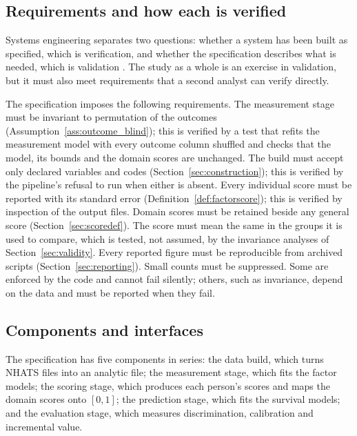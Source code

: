 \subsection{Requirements and how each is verified}

Systems engineering separates two questions: whether a system has been built as specified, which is verification, and whether the specification describes what is needed, which is validation \citep{incose_2015}. The study as a whole is an exercise in validation, but it must also meet requirements that a second analyst can verify directly.

The specification imposes the following requirements. The measurement stage must be invariant to permutation of the outcomes (Assumption~\ref{ass:outcome_blind}); this is verified by a test that refits the measurement model with every outcome column shuffled and checks that the model, its bounds and the domain scores are unchanged. The build must accept only declared variables and codes (Section~\ref{sec:construction}); this is verified by the pipeline's refusal to run when either is absent. Every individual score must be reported with its standard error (Definition~\ref{def:factorscore}); this is verified by inspection of the output files. Domain scores must be retained beside any general score (Section~\ref{sec:scoredef}). The score must mean the same in the groups it is used to compare, which is tested, not assumed, by the invariance analyses of Section~\ref{sec:validity}. Every reported figure must be reproducible from archived scripts (Section~\ref{sec:reporting}). Small counts must be suppressed. Some are enforced by the code and cannot fail silently; others, such as invariance, depend on the data and must be reported when they fail.

\subsection{Components and interfaces}

The specification has five components in series: the data build, which turns NHATS files into an analytic file; the measurement stage, which fits the factor models; the scoring stage, which produces each person's scores and maps the domain scores onto $[0,1]$; the prediction stage, which fits the survival models; and the evaluation stage, which measures discrimination, calibration and incremental value.

